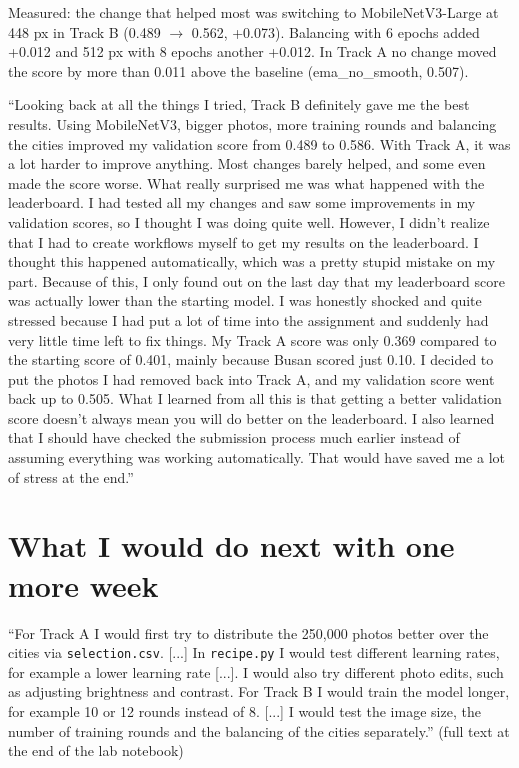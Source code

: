 \documentclass[11pt]{article}
\begin{document}
Measured: the change that helped most was switching to MobileNetV3-Large at
448 px in Track B (0.489 $\to$ 0.562, +0.073). Balancing with 6 epochs added
+0.012 and 512 px with 8 epochs another +0.012. In Track A no change moved the
score by more than 0.011 above the baseline (ema\_no\_smooth, 0.507).

``Looking back at all the things I tried, Track B definitely gave me the best results. Using MobileNetV3, bigger photos, more training rounds and balancing the cities improved my validation score from 0.489 to 0.586. With Track A, it was a lot harder to improve anything. Most changes barely helped, and some even made the score worse. What really surprised me was what happened with the leaderboard. I had tested all my changes and saw some improvements in my validation scores, so I thought I was doing quite well. However, I didn't realize that I had to create workflows myself to get my results on the leaderboard. I thought this happened automatically, which was a pretty stupid mistake on my part. Because of this, I only found out on the last day that my leaderboard score was actually lower than the starting model. I was honestly shocked and quite stressed because I had put a lot of time into the assignment and suddenly had very little time left to fix things. My Track A score was only 0.369 compared to the starting score of 0.401, mainly because Busan scored just 0.10. I decided to put the photos I had removed back into Track A, and my validation score went back up to 0.505. What I learned from all this is that getting a better validation score doesn't always mean you will do better on the leaderboard. I also learned that I should have checked the submission process much earlier instead of assuming everything was working automatically. That would have saved me a lot of stress at the end.''

\section*{What I would do next with one more week}

``For Track A I would first try to distribute the 250,000 photos better over
the cities via \texttt{selection.csv}. [...] In \texttt{recipe.py} I would test
different learning rates, for example a lower learning rate [...]. I would
also try different photo edits, such as adjusting brightness and contrast.
For Track B I would train the model longer, for example 10 or 12 rounds
instead of 8. [...] I would test the image size, the number of training
rounds and the balancing of the cities separately.'' (full text at the end of
the lab notebook)
\end{document}
